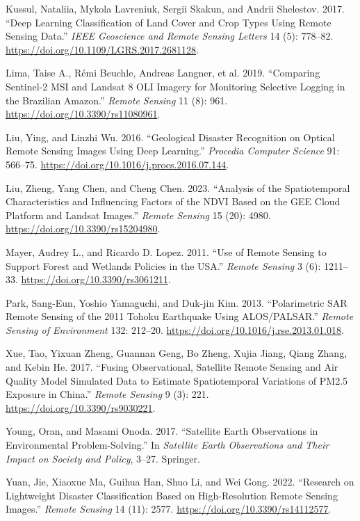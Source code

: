 \documentclass[
  letterpaper,
]{scrbook}
\newlength{\cslhangindent}
\newenvironment{CSLReferences}[2] %
 {\begin{list}{}{%
  \setlength{\itemindent}{0pt}
  \setlength{\leftmargin}{0pt}
  \setlength{\parsep}{0pt}
  \ifodd #1
   \setlength{\leftmargin}{\cslhangindent}
   \setlength{\itemindent}{-1\cslhangindent}
  \fi
  \setlength{\itemsep}{#2\baselineskip}}}
 {\end{list}}
\begin{document}
\begin{CSLReferences}{1}{0}
Kussul, Nataliia, Mykola Lavreniuk, Sergii Skakun, and Andrii Shelestov.
2017. {``Deep Learning Classification of Land Cover and Crop Types Using
Remote Sensing Data.''} \emph{IEEE Geoscience and Remote Sensing
Letters} 14 (5): 778--82.
\url{https://doi.org/10.1109/LGRS.2017.2681128}.

Lima, Taise A., Rémi Beuchle, Andreas Langner, et al. 2019. {``Comparing
Sentinel-2 MSI and Landsat 8 OLI Imagery for Monitoring Selective
Logging in the Brazilian Amazon.''} \emph{Remote Sensing} 11 (8): 961.
\url{https://doi.org/10.3390/rs11080961}.

Liu, Ying, and Linzhi Wu. 2016. {``Geological Disaster Recognition on
Optical Remote Sensing Images Using Deep Learning.''} \emph{Procedia
Computer Science} 91: 566--75.
\url{https://doi.org/10.1016/j.procs.2016.07.144}.

Liu, Zheng, Yang Chen, and Cheng Chen. 2023. {``Analysis of the
Spatiotemporal Characteristics and Influencing Factors of the {NDVI}
Based on the {GEE} Cloud Platform and {Landsat} Images.''} \emph{Remote
Sensing} 15 (20): 4980. \url{https://doi.org/10.3390/rs15204980}.

Mayer, Audrey L., and Ricardo D. Lopez. 2011. {``Use of Remote Sensing
to Support Forest and Wetlands Policies in the {USA}.''} \emph{Remote
Sensing} 3 (6): 1211--33. \url{https://doi.org/10.3390/rs3061211}.

Park, Sang-Eun, Yoshio Yamaguchi, and Duk-jin Kim. 2013. {``Polarimetric
SAR Remote Sensing of the 2011 Tohoku Earthquake Using ALOS/PALSAR.''}
\emph{Remote Sensing of Environment} 132: 212--20.
\url{https://doi.org/10.1016/j.rse.2013.01.018}.

Xue, Tao, Yixuan Zheng, Guannan Geng, Bo Zheng, Xujia Jiang, Qiang
Zhang, and Kebin He. 2017. {``Fusing Observational, Satellite Remote
Sensing and Air Quality Model Simulated Data to Estimate Spatiotemporal
Variations of {PM2}.5 Exposure in {China}.''} \emph{Remote Sensing} 9
(3): 221. \url{https://doi.org/10.3390/rs9030221}.

Young, Oran, and Masami Onoda. 2017. {``Satellite Earth Observations in
Environmental Problem-Solving.''} In \emph{Satellite Earth Observations
and Their Impact on Society and Policy}, 3--27. Springer.

Yuan, Jie, Xiaoxue Ma, Guihua Han, Shuo Li, and Wei Gong. 2022.
{``Research on Lightweight Disaster Classification Based on
High-Resolution Remote Sensing Images.''} \emph{Remote Sensing} 14 (11):
2577. \url{https://doi.org/10.3390/rs14112577}.

\end{CSLReferences}


\backmatter
\end{document}

